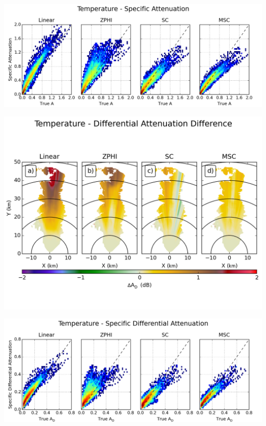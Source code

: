\documentclass[red]{beamer}
\begin{document}
\begin{frame}
	\begin{center}
		\includegraphics[scale=0.45]{figures/C_Temperature_Specific_Attenuation_scatter.png}
	\end{center}
\end{frame}

\begin{frame}
	\begin{center}
		\includegraphics[scale=0.45]{figures/C_Temperature_Differential_Attenuation_Difference.png}
	\end{center}
\end{frame}

\begin{frame}
	\begin{center}
		\includegraphics[scale=0.45]{figures/C_Temperature_Specific_Differential_Attenuation_scatter.png}
	\end{center}
\end{frame}
\end{document}
